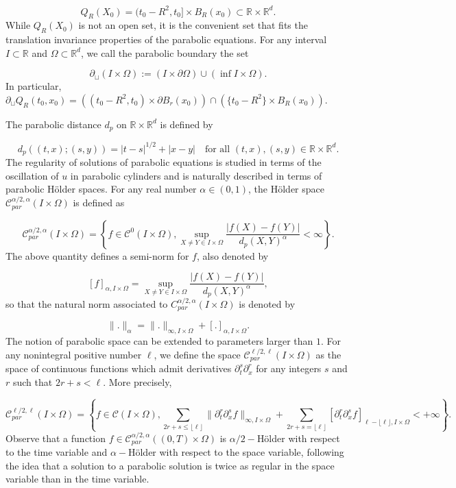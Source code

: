 \documentclass[reqno,12pt,twoside]{amsart}
\numberwithin{equation}{section} \numberwithin{theorem}{section}
\numberwithin{proposition}{section} \numberwithin{lemma}{section}
\numberwithin{corollary}{section}
\numberwithin{definition}{section} \numberwithin{remark}{section}
\begin{document}
\[Q_R(X_0) = (t_0 -R^2, t_0] \times B_R(x_0) \subset \mathbb{R}\times \mathbb{R}^d.\]
While $Q_R(X_0)$ is not an open set, it is the convenient set that fits the translation invariance properties of the parabolic equations. For any interval $I \subset \mathbb{R}$ and $\Omega \subset \mathbb{R}^d$, we call the parabolic boundary the set 

\[\partial_{\sqcup} (I \times \Omega) := (I \times \partial \Omega) \cup (\inf I \times \Omega).\]
In particular, $\partial_\sqcup Q_R(t_0,x_0) =((t_0-R^2, t_0) \times \partial B_r(x_0))\cap (\{t_0 -R^2\} \times B_R(x_0))$.   

\smallskip

The parabolic distance $d_p$ on $\mathbb{R}\times \mathbb{R}^d$ is defined by

\[d_p((t,x) ; (s, y)) = |t-s|^{1/2} + |x-y| \quad  \text{for all } (t,x),(s,y) \in \mathbb{R}\times \mathbb{R}^d.\]
The regularity of solutions of parabolic equations is studied in terms of the oscillation of $u$ in parabolic cylinders and is naturally described in terms of parabolic Hölder spaces. For any real number $\alpha\in (0,1)$, the Hölder space $\mathcal{C}_{par}^{\alpha/2, \alpha}(I\times \Omega)$ is defined as 

\[\mathcal{C}_{par}^{\alpha/2, \alpha}(I\times \Omega) = \left\{ f \in \mathcal{C}^0 (I\times \Omega), \sup_{X\neq Y \in I\times \Omega} \frac{|f(X) -f(Y)|}{d_p(X,Y)^\alpha} < \infty\right\}.\]
The above quantity defines a semi-norm for $f$, also denoted by

\[[f]_{\alpha , I\times \Omega} = \sup_{X\neq Y \in I\times \Omega} \frac{|f(X) -f(Y)|}{d_p(X,Y)^\alpha},\]
so that the natural norm associated to $C_{par}^{\alpha/2, \alpha}(I\times \Omega)$ is denoted by 

\[\|.\|_{\alpha} = \|.\|_{\infty , I\times \Omega} + [.]_{\alpha , I\times \Omega}.\]
The notion of parabolic space can be extended to parameters larger than $1$. For any nonintegral positive number $\ell$, we define the space $\mathcal{C}_{par}^{\ell/2, \ell}(I \times \Omega)$ as the space of continuous functions which admit derivatives $\partial_t^s \partial_x^r$ for any integers $s$ and $r$ such that $2r+s<\ell$. More precisely,  

\begin{equation}\label{def : Ckl}
\mathcal{C}_{par}^{\ell/2, \ell}(I \times \Omega) = \left\{f \in \mathcal{C}(I \times \Omega),  \sum_{2r+s \leqslant \lfloor \ell\rfloor} \|\partial_t^r \partial_x^s f\|_{\infty, I \times \Omega} + \sum_{2r+s = \lfloor \ell\rfloor} [\partial_t^r \partial_x^s f]_{\ell - \lfloor \ell \rfloor, I\times \Omega}  < +\infty \right\}.
\end{equation}  
Observe that a function $f\in \mathcal{C}_{par}^{\alpha/2, \alpha}((0,T)\times \Omega)$ is $\alpha/2-$Hölder with respect to the time variable and $\alpha-$Hölder with respect to the space variable, following the idea that a solution to a parabolic solution is twice as regular in the space variable than in the time variable.  
\end{document}
